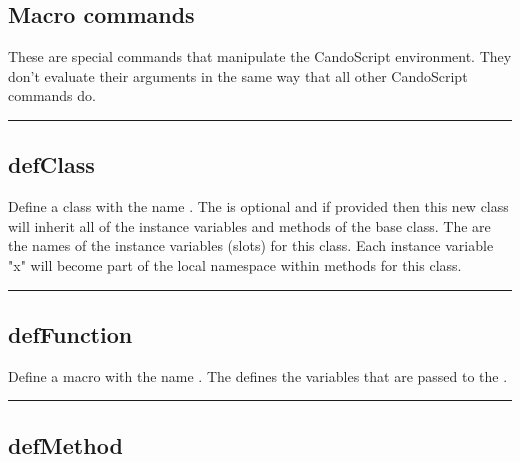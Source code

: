 \begin{itemize}
\section{Macro commands}
These are special commands that manipulate the CandoScript environment.
They don't evaluate their arguments in the same way that all other CandoScript commands do.

\rule{6in}{0.01cm}\par
{}\par
\subsection{defClass}
  \par

  Define a class with the name . 
  The  is optional and if provided then this new class
  will inherit all of the instance variables and methods of the base class.
  The  are the names of the instance variables (slots) for this class. Each instance variable "x" will become part of the local namespace within methods for this class.

\rule{6in}{0.01cm}\par
{}\par
\subsection{defFunction}

  Define a macro with the name .
  The  defines the variables that are
  passed to the .

\rule{6in}{0.01cm}\par
{}\par
\subsection{defMethod}


\end{itemize}
